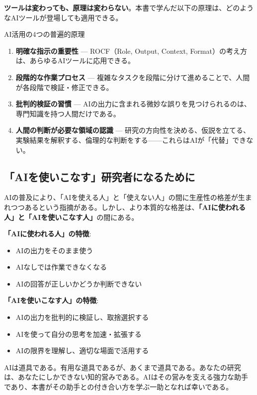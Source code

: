 \textbf{ツールは変わっても、原理は変わらない}。本書で学んだ以下の原理は、どのようなAIツールが登場しても適用できる。

\begin{itembox}[l]{AI活用の4つの普遍的原理}
\begin{enumerate}
\item \textbf{明確な指示の重要性} --- ROCF（Role, Output, Context, Format）の考え方は、あらゆるAIツールに応用できる。
\item \textbf{段階的な作業プロセス} --- 複雑なタスクを段階に分けて進めることで、人間が各段階で検証・修正できる。
\item \textbf{批判的検証の習慣} --- AIの出力に含まれる微妙な誤りを見つけられるのは、専門知識を持つ人間だけである。
\item \textbf{人間の判断が必要な領域の認識} --- 研究の方向性を決める、仮説を立てる、実験結果を解釈する、倫理的な判断をする——これらはAIが「代替」できない。
\end{enumerate}
\end{itembox}

\subsection*{「AIを使いこなす」研究者になるために}

AIの普及により、「AIを使える人」と「使えない人」の間に生産性の格差が生まれつつあるという指摘がある。しかし、より本質的な格差は、\textbf{「AIに使われる人」と「AIを使いこなす人」}の間にある。

\textbf{「AIに使われる人」の特徴}:
\begin{itemize}
\item AIの出力をそのまま使う
\item AIなしでは作業できなくなる
\item AIの回答が正しいかどうか判断できない
\end{itemize}

\textbf{「AIを使いこなす人」の特徴}:
\begin{itemize}
\item AIの出力を批判的に検証し、取捨選択する
\item AIを使って自分の思考を加速・拡張する
\item AIの限界を理解し、適切な場面で活用する
\end{itemize}

AIは道具である。有用な道具であるが、あくまで道具である。あなたの研究は、あなたにしかできない知的営みである。AIはその営みを支える強力な助手であり、本書がその助手との付き合い方を学ぶ一助となれば幸いである。

